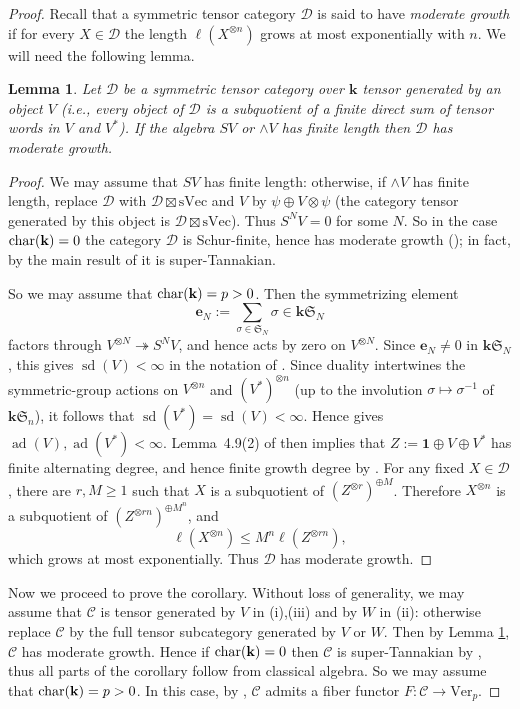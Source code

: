\documentclass[12pt]{amsart}
\numberwithin{equation}{section}
\providecommand{\k}{}\renewcommand{\k}{\mathbf{k}}
\providecommand{\C}{}\renewcommand{\C}{\mathcal{C}}
\providecommand{\D}{}\renewcommand{\D}{\mathcal{D}}
\providecommand{\sVec}{}\renewcommand{\sVec}{\mathrm{sVec}}
\providecommand{\Ver}{}\renewcommand{\Ver}{\mathrm{Ver}}
\theoremstyle{plain}
\newtheorem{lemma}[theorem]{Lemma}
\theoremstyle{definition}
\theoremstyle{remark}
\begin{document}
\begin{proof} Recall that a symmetric tensor category $\D$ is said to have {\it moderate growth} if for every 
$X\in \D$ the length $\ell(X^{\otimes n})$ grows at most exponentially with $n$. 
We will need the following lemma. 

\begin{lemma}\label{lemo} Let $\D$ be a symmetric tensor category over $\k$ tensor generated by an object $V$ (i.e., 
every object of $\D$ is a subquotient of a finite direct sum of tensor words in $V$ and $V^*$). If the algebra 
$SV$ or $\wedge V$ has finite length then $\D$ has moderate growth. 
\end{lemma} 

\begin{proof} We may assume that $SV$ has finite length: otherwise, if $\wedge V$ has finite length, 
replace $\D$ with $\D\boxtimes \sVec$ and $V$ by $\psi\oplus V\otimes \psi$ (the category tensor generated by this object is $\D\boxtimes \sVec$). Thus $S^NV=0$ for some $N$. So in the case ${\rm char}(\k)=0$ the category $\D$ 
is Schur-finite, hence has moderate growth (\cite{De}); in fact, by the main result of 
\cite{De} it is super-Tannakian. 

So we may assume that ${\rm char}(\k)=p>0$. 
Then the symmetrizing element
\[
\mathbf e_N:=\sum_{\sigma\in\mathfrak S_N}\sigma\in\k\mathfrak S_N
\]
factors through $V^{\otimes N}\twoheadrightarrow S^NV$, and hence acts by zero on $V^{\otimes N}$. Since $\mathbf e_N\ne0$ in $\k\mathfrak S_N$, this gives $\operatorname{sd}(V)<\infty$ in the notation of \cite[Definition~4.1]{CEO}.
Since duality intertwines the symmetric-group actions on $V^{\otimes n}$ and $(V^*)^{\otimes n}$ (up to the involution $\sigma\mapsto\sigma^{-1}$ of $\k\mathfrak S_n$), it follows that $\operatorname{sd}(V^*)=\operatorname{sd}(V)<\infty$. Hence \cite[Proposition~4.7(6)]{CEO} gives $\operatorname{ad}(V),\operatorname{ad}(V^*)<\infty$. Lemma~4.9(2) of \cite{CEO} then implies that
$Z:=\mathbf1\oplus V\oplus V^*$ has finite alternating degree, and hence finite growth degree by \cite[Proposition~4.7(5)]{CEO}. For any fixed $X\in\D$, there are $r,M\ge1$ such that $X$ is a subquotient of $(Z^{\otimes r})^{\oplus M}$. Therefore $X^{\otimes n}$ is a subquotient of $(Z^{\otimes rn})^{\oplus M^n}$, and
\[
 \ell(X^{\otimes n})\le M^n\ell(Z^{\otimes rn}),
\]
which grows at most exponentially. Thus $\D$ has moderate growth.
\end{proof} 

Now we proceed to prove the corollary. Without loss of generality, we may assume that $\C$ is tensor generated by $V$ in (i),(iii) and by $W$ in (ii): otherwise replace $\C$ by the full tensor subcategory generated by $V$ or $W$. Then by Lemma \ref{lemo}, $\C$ has moderate growth. Hence if ${\rm char}(\k)=0$ then $\C$ is super-Tannakian by \cite{De}, thus all parts of the corollary follow from classical algebra. So we may assume that ${\rm char}(\k)=p>0$. 
In this case, by \cite{CEO}, $\C$ admits a fiber functor $F: \C\to \Ver_p$.


\end{proof}
\end{document}
